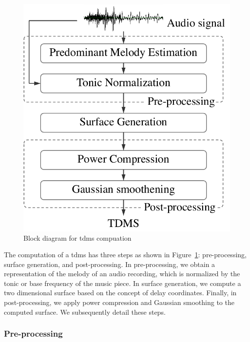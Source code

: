 \begin{figure}
	\begin{center}
		\includegraphics[width=\figSizeSixty]{ch07_ragaRecognition/figures/tdms_computation.pdf}
	\end{center}
	\caption{Block diagram for \gls{tdms} compuation}
	\label{fig:bd_tdms_computation}
\end{figure}

The computation of a \gls{tdms} has three steps as shown in Figure~\ref{fig:bd_tdms_computation}: pre-processing, surface generation, and post-processing. In pre-processing, we obtain a representation of the melody of an audio recording, which is normalized by the tonic or base frequency of the music piece. In surface generation, we compute a two dimensional surface based on the concept of delay coordinates. Finally, in post-processing, we apply power compression and Gaussian smoothing to the computed surface. We subsequently detail these steps.

\subsubsection{Pre-processing}
\label{sec:tdms_preprocessing}

